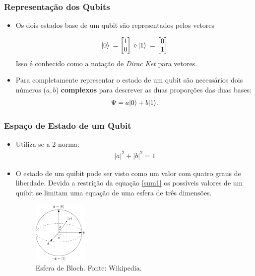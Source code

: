 \documentclass{beamer}
\DeclarePairedDelimiter\ket{\lvert}{\rangle}
\begin{document}
\begin{frame}
\frametitle{Representação dos Qubits}
\begin{itemize}
  \item Os dois estados base de um qubit são representados pelos vetores

\begin{align}
\label{vet}
  \ket{0} \: = \begin{bmatrix} 
          1 \\ 
          0 \\ 
        \end{bmatrix}
  \:\text{e}\:
  \ket{1} \: = \begin{bmatrix} 
          0 \\ 
          1 \\ 
        \end{bmatrix}
\end{align}
Isso é conhecido como a notação de \textit{Dirac Ket} para vetores.
\item Para completamente representar o estado de um qubit são
  necessários dois números ($a, b$) \textbf{complexos} para descrever
  as duas proporções das duas bases:
\begin{align}
\label{amp}
  \Psi = a \ket{0} + b \ket{1}.
\end{align}
\end{itemize}
\end{frame}

\begin{frame}
\frametitle{Espaço de Estado de um Qubit}
\begin{itemize}
\item Utiliza-se a 2-norma:
  \begin{align}
    \label{sum1}
      |a|^2 + |b|^2 = 1
  \end{align}
\item O estado de um quibit pode ser visto como um valor com quatro graus de
liberdade. Devido a restrição da equação \ref{sum1} os possíveis valores de um
quibit se limitam uma equação de uma esfera de três dimensões.
\begin{figure}[h]
\label{bloch}
\centering
\includegraphics[width=0.25\textwidth]{bloch.png}
\caption{Esfera de Bloch. Fonte: Wikipedia.}
\end{figure}
\end{itemize}
\end{frame}
\end{document}
